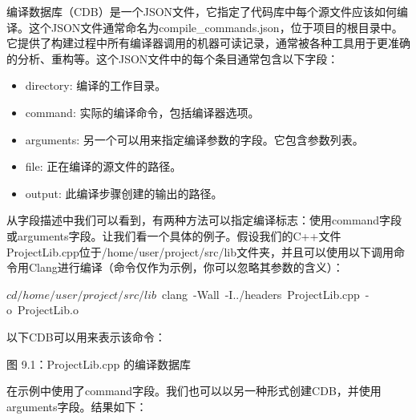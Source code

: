 编译数据库（CDB）是一个JSON文件，它指定了代码库中每个源文件应该如何编译。这个JSON文件通常命名为compile\_commands.json，位于项目的根目录中。它提供了构建过程中所有编译器调用的机器可读记录，通常被各种工具用于更准确的分析、重构等。这个JSON文件中的每个条目通常包含以下字段：

\begin{itemize}
\item
directory: 编译的工作目录。

\item
command: 实际的编译命令，包括编译器选项。

\item
arguments: 另一个可以用来指定编译参数的字段。它包含参数列表。

\item
file: 正在编译的源文件的路径。

\item
output: 此编译步骤创建的输出的路径。
\end{itemize}

从字段描述中我们可以看到，有两种方法可以指定编译标志：使用command字段或arguments字段。让我们看一个具体的例子。假设我们的C++文件ProjectLib.cpp位于/home/user/project/src/lib文件夹，并且可以使用以下调用命令用Clang进行编译（命令仅作为示例，你可以忽略其参数的含义）：

\begin{shell}
$ cd /home/user/project/src/lib
$ clang -Wall -I../headers ProjectLib.cpp -o ProjectLib.o
\end{shell}

以下CDB可以用来表示该命令：

\begin{shell}
\end{shell}

\begin{center}
图 9.1：ProjectLib.cpp 的编译数据库
\end{center}

在示例中使用了command字段。我们也可以以另一种形式创建CDB，并使用arguments字段。结果如下：

\begin{shell}
\end{shell}

